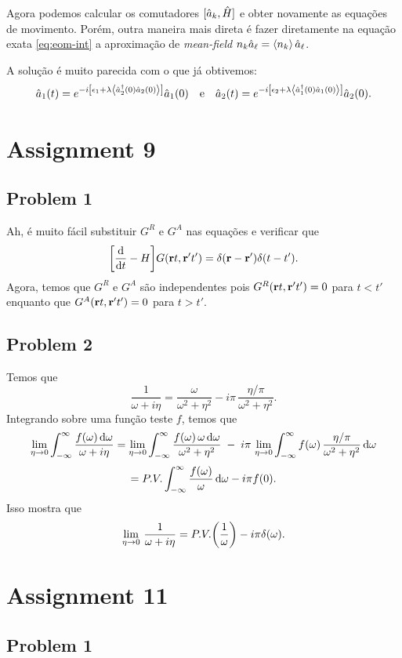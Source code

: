 \documentclass[a4paper,fleqn,12pt]{article}
\begin{document}
Agora podemos calcular os comutadores $[\hat{a}_k, \hat{H}]$ e obter novamente as equações de movimento. Porém, outra maneira mais direta é fazer diretamente na equação exata \ref{eq:eom-int} a aproximação de \textit{mean-field} $n_k \a_\ell = \ev{n_k} \a_\ell$.

A solução é muito parecida com o que já obtivemos:
$$
\a_1(t) = e^{-i\qty[\eps_1 + \lambda \ev{\a_2^\dagger(0) \a_2(0)}]} \a_1(0) \e
\a_2(t) = e^{-i\qty[\eps_2 + \lambda \ev{\a_1^\dagger(0) \a_1(0)}]} \a_2(0).
$$


\section{Assignment 9}

\subsection{Problem 1}

Ah, é muito fácil substituir $G^R$ e $G^A$ nas equações e verificar que
$$
\qty[\dv{t} - H] G(\vb{r} t, \vb{r}' t') = \delta(\vb{r}-\vb{r}') \delta(t-t').
$$
Agora, temos que $G^R$ e $G^A$ são independentes pois $G^R(\vb{r} t, \vb{r}' t') = 0$ para $t < t'$ enquanto que $G^A(\vb{r} t, \vb{r}' t') = 0$ para $t > t'$.

\subsection{Problem 2}

Temos que
$$
\frac{1}{\omega + i \eta} = \frac{\omega}{\omega^2 + \eta^2} - i \pi \, \frac{\eta/\pi}{\omega^2 + \eta^2}.
$$
Integrando sobre uma função teste $f$, temos que
$$
\lim_{\eta \to 0} \int_{-\infty}^{\infty} \frac{f(\omega) \dd{\omega}}{\omega + i\eta} =
\lim_{\eta \to 0} \int_{-\infty}^{\infty} \frac{f(\omega) \, \omega \dd{\omega}}{\omega^2 + \eta^2} \; - \;
i \pi \, \lim_{\eta \to 0} \int_{-\infty}^{\infty} f(\omega) \, \frac{\eta/\pi}{\omega^2 + \eta^2} \dd{\omega}
$$
$$
= P.V. \int_{-\infty}^{\infty} \frac{f(\omega)}{\omega} \dd{\omega} - i \pi f(0).
$$
Isso mostra que
$$
\lim_{\eta \to 0} \, \frac{1}{\omega + i\eta} = P.V. \qty(\frac{1}{\omega}) - i \pi \delta(\omega).
$$


\section{Assignment 11}

\subsection{Problem 1}
\end{document}

